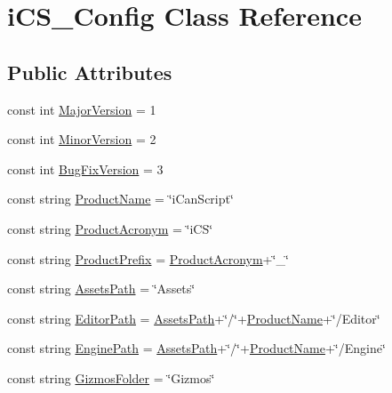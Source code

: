 \hypertarget{classi_c_s___config}{\section{i\+C\+S\+\_\+\+Config Class Reference}
\label{classi_c_s___config}
}
\subsection*{Public Attributes}
\begin{DoxyCompactItemize}
\item 
const int \hyperlink{classi_c_s___config_aa9a3b07dafcb7149e62f529e3fc21a52}{Major\+Version} = 1
\item 
const int \hyperlink{classi_c_s___config_aa5aa40cbc25b7765e68683028cc5d023}{Minor\+Version} = 2
\item 
const int \hyperlink{classi_c_s___config_af7f6930e44af226c2c4c3a28ad40aa05}{Bug\+Fix\+Version} = 3
\item 
const string \hyperlink{classi_c_s___config_a237de99fe2941f28906828de3715218c}{Product\+Name} = \char`\"{}i\+Can\+Script\char`\"{}
\item 
const string \hyperlink{classi_c_s___config_aadaab850be742d21b356bc7fcde2429e}{Product\+Acronym} = \char`\"{}i\+C\+S\char`\"{}
\item 
const string \hyperlink{classi_c_s___config_a649ce0774f2983687c1df5b557a85053}{Product\+Prefix} = \hyperlink{classi_c_s___config_aadaab850be742d21b356bc7fcde2429e}{Product\+Acronym}+\char`\"{}\+\_\+\char`\"{}
\item 
const string \hyperlink{classi_c_s___config_a97c18809af498cfdb5c1d6b3e129f8c8}{Assets\+Path} = \char`\"{}Assets\char`\"{}
\item 
const string \hyperlink{classi_c_s___config_a97f62a34e25595599ce79964a3f51bc5}{Editor\+Path} = \hyperlink{classi_c_s___config_a97c18809af498cfdb5c1d6b3e129f8c8}{Assets\+Path}+\char`\"{}/\char`\"{}+\hyperlink{classi_c_s___config_a237de99fe2941f28906828de3715218c}{Product\+Name}+\char`\"{}/Editor\char`\"{}
\item 
const string \hyperlink{classi_c_s___config_a2f5403f52111ed8b128f97d3b4c7127d}{Engine\+Path} = \hyperlink{classi_c_s___config_a97c18809af498cfdb5c1d6b3e129f8c8}{Assets\+Path}+\char`\"{}/\char`\"{}+\hyperlink{classi_c_s___config_a237de99fe2941f28906828de3715218c}{Product\+Name}+\char`\"{}/Engine\char`\"{}
\item 
const string \hyperlink{classi_c_s___config_ab6c5e096caef44eeea54b2750d4a623e}{Gizmos\+Folder} = \char`\"{}Gizmos\char`\"{}

\end{DoxyCompactItemize}

